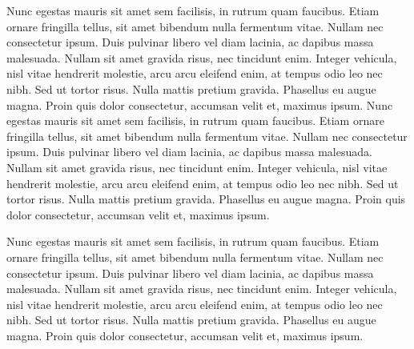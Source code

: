 Nunc egestas mauris sit amet sem facilisis, in rutrum quam faucibus. Etiam
ornare fringilla tellus, sit amet bibendum nulla fermentum vitae. Nullam nec
consectetur ipsum. Duis pulvinar libero vel diam lacinia, ac dapibus massa
malesuada. Nullam sit amet gravida risus, nec tincidunt enim. Integer vehicula,
nisl vitae hendrerit molestie, arcu arcu eleifend enim, at tempus odio leo nec
nibh. Sed ut tortor risus. Nulla mattis pretium gravida. Phasellus eu augue
magna. Proin quis dolor consectetur, accumsan velit et, maximus ipsum. Nunc
egestas mauris sit amet sem facilisis, in rutrum quam faucibus. Etiam ornare
fringilla tellus, sit amet bibendum nulla fermentum vitae. Nullam nec
consectetur ipsum. Duis pulvinar libero vel diam lacinia, ac dapibus massa
malesuada. Nullam sit amet gravida risus, nec tincidunt enim. Integer vehicula,
nisl vitae hendrerit molestie, arcu arcu eleifend enim, at tempus odio leo nec
nibh. Sed ut tortor risus. Nulla mattis pretium gravida. Phasellus eu augue
magna. Proin quis dolor consectetur, accumsan velit et, maximus ipsum. 

Nunc egestas mauris sit amet sem facilisis, in rutrum quam faucibus. Etiam
ornare fringilla tellus, sit amet bibendum nulla fermentum vitae. Nullam nec
consectetur ipsum. Duis pulvinar libero vel diam lacinia, ac dapibus massa
malesuada. Nullam sit amet gravida risus, nec tincidunt enim. Integer vehicula,
nisl vitae hendrerit molestie, arcu arcu eleifend enim, at tempus odio leo nec
nibh. Sed ut tortor risus. Nulla mattis pretium gravida. Phasellus eu augue
magna. Proin quis dolor consectetur, accumsan velit et, maximus ipsum. 



\newcommand{\suma}{\Large$+$}
\newcommand{\inte}{$\displaystyle \int$}
\newcommand{\derv}{\huge$\frac{d}{dt}$}

